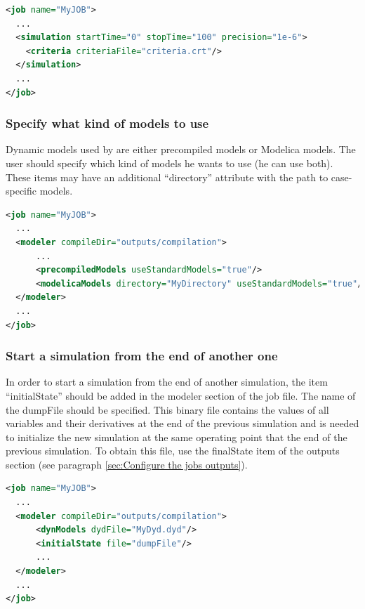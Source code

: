 \documentclass[a4paper, 12pt]{report}
\begin{document}
\begin{lstlisting}[language=XML, morekeywords={activateCriteria}]
<job name="MyJOB">
  ...
  <simulation startTime="0" stopTime="100" precision="1e-6">
    <criteria criteriaFile="criteria.crt"/>
  </simulation>
  ...
</job>
\end{lstlisting}

\subsubsection{Specify what kind of models to use}

Dynamic models used by \Dynawo are either precompiled models or Modelica models. The user should specify which kind of models he wants to use (he can use both). These items may have an additional ``directory'' attribute with the path to case-specific models.

\begin{lstlisting}[language=XML, morekeywords={precompiledModels, modelicaModels}]
<job name="MyJOB">
  ...
  <modeler compileDir="outputs/compilation">
      ...
      <precompiledModels useStandardModels="true"/>
      <modelicaModels directory="MyDirectory" useStandardModels="true"/>
  </modeler>
  ...
</job>
\end{lstlisting}

\subsubsection{Start a simulation from the end of another one}

In order to start a simulation from the end of another simulation, the item ``initialState'' should be added in the modeler section of the job file. The name of the dumpFile should be specified. This binary file contains the values of all variables and their derivatives at the end of the previous simulation and is needed to initialize the new simulation at the same operating point that the end of the previous simulation. To obtain this file, use the finalState item of the outputs section (see paragraph \ref{sec:Configure the jobs outputs}).

\begin{lstlisting}[language=XML, morekeywords={initialState}]
<job name="MyJOB">
  ...
  <modeler compileDir="outputs/compilation">
      <dynModels dydFile="MyDyd.dyd"/>
      <initialState file="dumpFile"/>
      ...
  </modeler>
  ...
</job>
\end{lstlisting}
\end{document}
